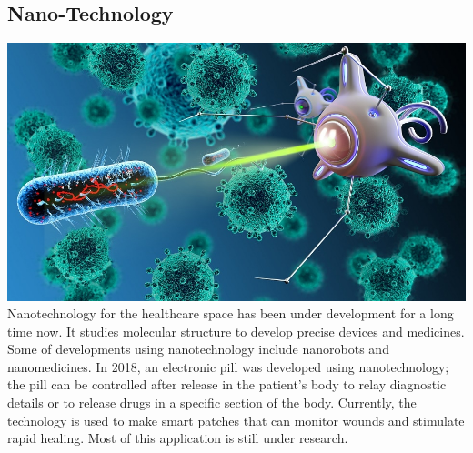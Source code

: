 \documentclass[12pt]{article}
\begin{document}
\subsection*{Nano-Technology}
 \includegraphics[scale=0.2]{nano.jpg }
 \\
Nanotechnology for the healthcare space has been under development for a long time now. It studies molecular structure to develop precise devices and medicines. Some of developments using nanotechnology include nanorobots and nanomedicines. In 2018, an electronic pill was developed using nanotechnology; the pill can be controlled after release in the patient’s body to relay diagnostic details or to release drugs in a specific section of the body. Currently, the technology is used to make smart patches that can monitor wounds and stimulate rapid healing. Most of this application is still under research.


\enddocument
\end{document}
